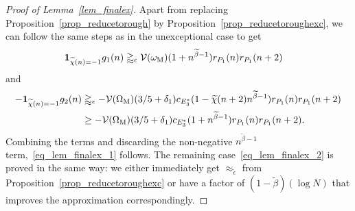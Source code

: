 \documentclass[12pt]{amsart}
\theoremstyle{definition}
\theoremstyle{remark}
\numberwithin{equation}{section}
\newcommand{\1}{\mathbf{1}}
\begin{document}
\begin{proof}[Proof of Lemma~\ref{lem_finalex}]
              Apart from replacing Proposition~\ref{prop_reducetorough} by Proposition~\ref{prop_reducetoroughexc}, we can follow the same steps as in the unexceptional case to get
              \begin{align*}
                  \1_{\widetilde{\chi}(n)=-1}g_1(n)&\gtrapprox_{\epsilon} \mathcal{V}(\omega_{\textup{M}}) (1+n^{\widetilde{\beta}-1})r_{P_1}(n)r_{P_1}(n+2)
              \end{align*}
              and
              \begin{align*}
                  -\1_{\widetilde{\chi}(n)=-1}g_2(n)&\gtrapprox_\epsilon  -\mathcal{V}(\Omega_{\textup{M}})(3/5+\delta_1)c_{E_3^*} (1-\widetilde{\chi}(n+2)n^{\widetilde{\beta}-1})r_{P_1}(n)r_{P_1}(n+2)\\
                  &\geq - \mathcal{V}(\Omega_{\textup{M}})(3/5+\delta_1)c_{E_3^*} (1+n^{\widetilde{\beta}-1})r_{P_1}(n)r_{P_1}(n+2).
              \end{align*}
              Combining the terms and discarding the non-negative $n^{\widetilde{\beta}-1}$ term,~\eqref{eq_lem_finalex_1} follows. The remaining case~\eqref{eq_lem_finalex_2} is proved in the same way: we either immediately get $\approx_{\widetilde{\epsilon}}$ from Proposition~\ref{prop_reducetoroughexc} or have a factor of $(1-\widetilde{\beta})(\log N) $ that improves the approximation correspondingly.
              
              \end{proof}
          
\end{document}
